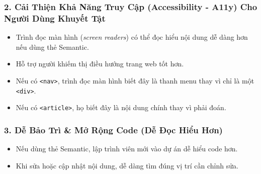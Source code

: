 \documentclass[11pt,oneside]{book}
\newcommand{\thd}[1]{\textcolor{white}{\textbf{\strut #1}}}
\newcommand{\codeinline}[1]{\textcolor{accentOrange}{\texttt{#1}}}
\begin{document}
\begin{prettyTableBox}
\end{prettyTableBox}

\subsubsection{2. Cải Thiện Khả Năng Truy Cập (Accessibility - A11y) Cho Người Dùng Khuyết Tật}
\begin{itemize}[leftmargin=1.8em, itemsep=3pt, parsep=0pt]
    \item Trình đọc màn hình (\textit{screen readers}) có thể đọc hiểu nội dung dễ dàng hơn nếu dùng thẻ Semantic.
    \item Hỗ trợ người khiếm thị điều hướng trang web tốt hơn.
\end{itemize}

\begin{noteBox}
\begin{itemize}[leftmargin=1.5em, itemsep=2pt, parsep=0pt]
    \item Nếu có \codeinline{<nav>}, trình đọc màn hình biết đây là thanh menu thay vì chỉ là một \codeinline{<div>}.
    \item Nếu có \codeinline{<article>}, họ biết đây là nội dung chính thay vì phải đoán.
\end{itemize}
\end{noteBox}

\subsubsection{3. Dễ Bảo Trì \& Mở Rộng Code (Dễ Đọc Hiểu Hơn)}
\begin{itemize}[leftmargin=1.8em, itemsep=3pt, parsep=0pt]
    \item Nếu dùng thẻ Semantic, lập trình viên mới vào dự án dễ hiểu code hơn.
    \item Khi sửa hoặc cập nhật nội dung, dễ dàng tìm đúng vị trí cần chỉnh sửa.
\end{itemize}
\end{document}
